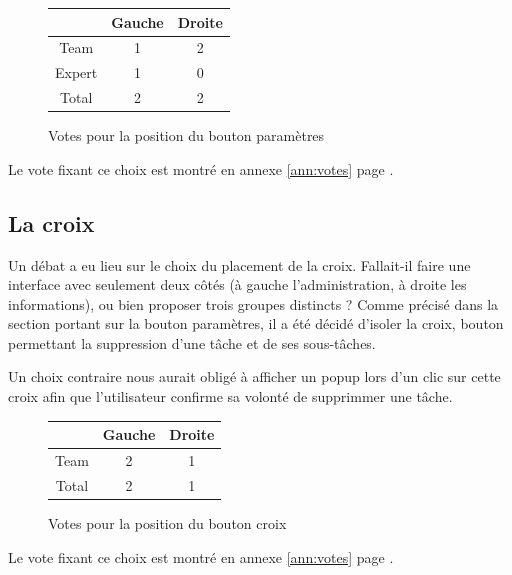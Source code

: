 \documentclass[11pt]{article}
\begin{document}
\begin{figure}[!h]
  \centering
  \begin{tabular}[!h]{cc|c}
    & Gauche & Droite\\
    \hline
    Team & 1 & 2\\
    Expert & 1 & 0\\
    \hline
    Total & 2 & 2\\
  \end{tabular}
  \caption{Votes pour la position du bouton paramètres}
  \label{fig:voteparam}
\end{figure}

Le vote fixant ce choix est montré en annexe \ref{ann:votes} page \pageref{fig:paramvote}.



\subsection{La croix}
\label{subsec:croixPlacement}

Un débat a eu lieu sur le choix du placement de la croix. Fallait-il
faire une interface avec seulement deux côtés (à gauche
l'administration, à droite les informations), ou bien proposer trois
groupes distincts ? Comme précisé dans la section portant sur la
bouton paramètres, il a été décidé d'isoler la croix, bouton
permettant la suppression d'une tâche et de ses sous-tâches.

Un choix contraire nous aurait obligé à afficher un popup lors d'un
clic sur cette croix afin que l'utilisateur confirme sa volonté de
supprimmer une tâche.

\begin{figure}[!h]
  \centering
  \begin{tabular}[!h]{cc|c}
    & Gauche & Droite\\
    \hline
    Team & 2 & 1\\
    \hline
    Total & 2 & 1\\
  \end{tabular}
  \caption{Votes pour la position du bouton croix}
  \label{fig:votecroix}
\end{figure}

Le vote fixant ce choix est montré en annexe \ref{ann:votes} page
\pageref{fig:croixgroupevote}.

\end{document}
